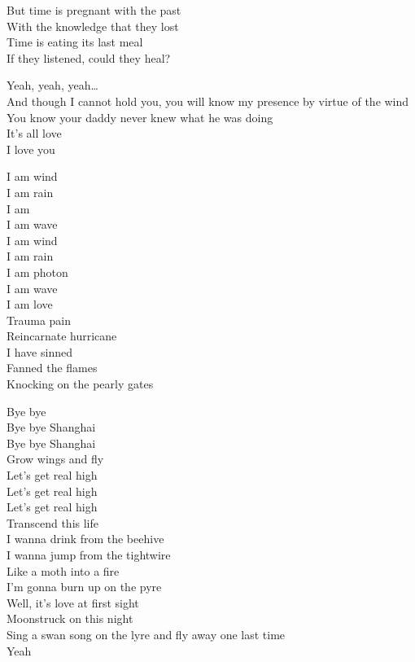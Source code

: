 
But time is pregnant with the past \\
With the knowledge that they lost \\
Time is eating its last meal \\
If they listened, could they heal? \\


Yeah, yeah, yeah… \\
And though I cannot hold you, you will know my presence by virtue of the wind \\
You know your daddy never knew what he was doing \\
It's all love \\
I love you \\


I am wind \\
I am rain \\
I am  \\
I am wave \\
I am wind \\
I am rain \\
I am photon \\
I am wave \\
I am love \\
Trauma pain \\
Reincarnate hurricane \\
I have sinned \\
Fanned the flames \\
Knocking on the pearly gates \\




Bye bye  \\
Bye bye Shanghai \\
Bye bye Shanghai \\
Grow wings and fly \\
Let's get real high \\
Let's get real high \\
Let's get real high \\
Transcend this life \\

I wanna drink from the beehive \\
I wanna jump from the tightwire \\
Like a moth into a fire \\
I'm gonna burn up on the pyre \\
Well, it's love at first sight \\
Moonstruck on this night \\
Sing a swan song on the lyre and fly away one last time \\
Yeah \\

